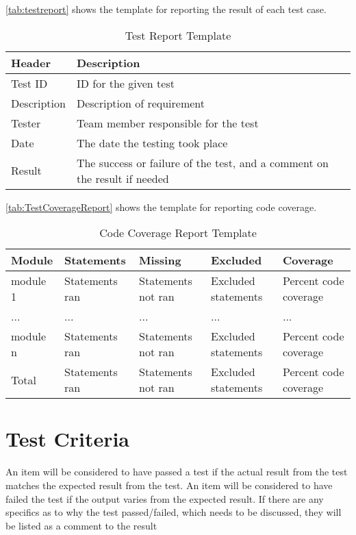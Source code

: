 \autoref{tab:testreport} shows the template for reporting the result of each test case.

\begin{table}[htb] \small \center
\caption{Test Report Template \label{tab:testreport}}
\begin{tabular}{l l}
	\toprule
	Header & Description \\
	\midrule
	Test ID & ID for the given test \\
	Description & Description of requirement \\
	Tester & Team member responsible for the test \\
	Date & The date the testing took place \\
	Result & The success or failure of the test, and a comment on the result if needed \\
	\bottomrule
\end{tabular}
\end{table}

\autoref{tab:TestCoverageReport} shows the template for reporting code coverage.

\begin{table}[!htb]\footnotesize\center
	\caption{Code Coverage Report Template\label{tab:TestCoverageReport}}
	\begin{tabular}{l l l l l}
		\toprule
		Module & Statements & Missing & Excluded & Coverage\\
		\midrule
		module 1 & Statements ran & Statements not ran  & Excluded statements & Percent code coverage\ \\
		... & ... & ... & ... & ... \\
		module n & Statements ran & Statements not ran & Excluded statements  & Percent code coverage \\
		\bottomrule
		Total & Statements ran & Statements not ran & Excluded statements & Percent code coverage \\
		\bottomrule
	\end{tabular}
\end{table}


\section{Test Criteria}
An item will be considered to have passed a test if the actual result from the test matches the expected result from the test. An item will be considered to have failed the test if the output varies from the expected result. If there are any specifics as to why the test passed/failed, which needs to be discussed, they will be listed as a comment to the result


